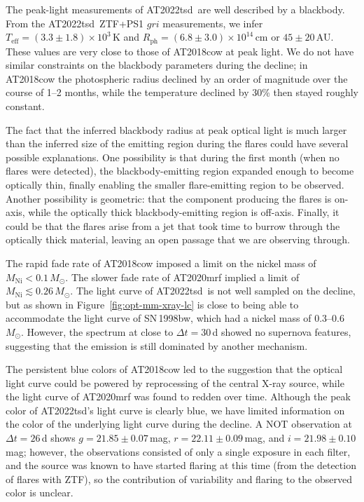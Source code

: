 \documentclass{nature_plusfigure}
\newcommand{\at}{AT2022tsd}
\begin{document}
\begin{methods}
The peak-light measurements of \at\ are well described by a blackbody. From the \at\ ZTF+PS1 $gri$ measurements, we infer $T_\mathrm{eff}=(3.3\pm 1.8) \times 10^{3}$\,K and $R_\mathrm{ph}=(6.8\pm3.0)\times10^{14}\,$cm or $45\pm20$\,AU. These values are very close to those of AT2018cow at peak light. We do not have similar constraints on the blackbody parameters during the decline; in AT2018cow the photospheric radius declined by an order of magnitude over the course of 1--2 months, while the temperature declined by 30\% then stayed roughly constant. 

The fact that the inferred blackbody radius at peak optical light is much larger than the inferred size of the emitting region during the flares could have several possible explanations. One possibility is that during the first month (when no flares were detected), the blackbody-emitting region expanded enough to become optically thin, finally enabling the smaller flare-emitting region to be observed. 
Another possibility is geometric: that the component producing the flares is on-axis, while the optically thick blackbody-emitting region is off-axis.
Finally, it could be that the flares arise from a jet that took time to burrow through the optically thick material, leaving an open passage that we are observing through.

The rapid fade rate of AT2018cow imposed a limit on the nickel mass\cite{Perley2019,Margutti2019} of $M_\mathrm{Ni}<0.1\,M_\odot$. The slower fade rate of AT2020mrf implied\cite{Yao2022} a limit of $M_\mathrm{Ni}\lesssim 0.26\,M_\odot$. The light curve of \at\ is not well sampled on the decline, but as shown in Figure~\ref{fig:opt-mm-xray-lc} is close to being able to accommodate the light curve of SN\,1998bw, which had\cite{Cano2017} a nickel mass of 0.3--0.6\,$M_\odot$. However, the spectrum at close to $\Delta t=30$\,d showed no supernova features, suggesting that the emission is still dominated by another mechanism.

The persistent blue colors of AT2018cow led to the suggestion that the optical light curve could be powered by reprocessing of the central X-ray source\cite{Margutti2019}, while the light curve of AT2020mrf was found to redden over time\cite{Yao2022}. Although the peak color of \at's light curve is clearly blue, we have limited information on the color of the underlying light curve during the decline. A NOT observation at $\Delta t=26\,$d shows $g=21.85\pm0.07\,$mag, $r=22.11\pm0.09\,$mag, and $i=21.98\pm0.10\,$mag; however, the observations consisted of only a single exposure in each filter, and the source was known to have started flaring at this time (from the detection of flares with ZTF), so the contribution of variability and flaring to the observed color is unclear.


\end{methods}
\end{document}
